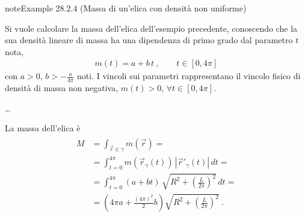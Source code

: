 \documentclass[letterpaper,10pt,italian]{jupyterBook}
\begin{document}
\begin{sphinxadmonition}{note}{Example 28.2.4 (Massa di un’elica con densità non uniforme)}



\sphinxAtStartPar
Si vuole calcolare la massa dell’elica dell’esempio precedente, conoscendo che la sua densità lineare di massa ha una dipendenza di primo grado dal parametro \(t\) nota,
\begin{equation*}
\begin{split}m(t) = a + b \, t \ , \qquad t \in \left[ 0, 4 \pi \right]\end{split}
\end{equation*}
\sphinxAtStartPar
con \(a > 0\), \(b > -\frac{a}{4 \pi}\) noti. I vincoli sui parametri rappresentano il vincolo fisico di densità di massa non negativa, \(m(t) > 0\), \(\forall t \in [0, 4 \pi]\).

\sphinxAtStartPar
…

\sphinxAtStartPar
La massa dell’elica è
\begin{equation*}
\begin{split}\begin{aligned}
  M & = \int_{\vec{r} \in \gamma} m(\vec{r}) = \\
    & = \int_{t = 0}^{4 \pi} m(\vec{r}_{\gamma}(t)) \, |\vec{r}'_{\gamma}(t)| \, dt = \\
    & = \int_{t = 0}^{4 \pi} \left( a + b t \right) \, \sqrt{ R^2 + \left(\frac{L}{2 \pi}\right)^2 } \,  dt =\\
    & = \left( 4 \pi a + \frac{(4 \pi)^2}{2} b \right) \sqrt{ R^2 + \left(\frac{L}{2 \pi}\right)^2 }   \ .
\end{aligned}\end{split}
\end{equation*}\end{sphinxadmonition}
\end{document}
